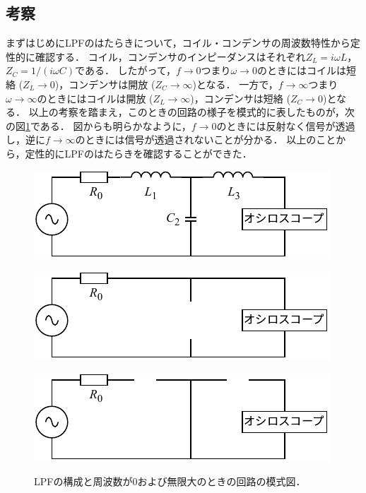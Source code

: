 \documentclass[uplatex,dvipdfmx,a4j,12pt]{jsarticle}
\begin{document}
\subsection{考察}
まずはじめにLPFのはたらきについて，コイル・コンデンサの周波数特性から定性的に確認する．
コイル，コンデンサのインピーダンスはそれぞれ$Z_L = i\omega L$，$Z_C = 1/(i\omega C)$である．
したがって，$f \to 0$つまり$\omega \to 0$のときにはコイルは短絡 ($Z_L \to 0$)，コンデンサは開放 ($Z_C \to \infty$)となる．
一方で，$f \to \infty$つまり$\omega \to \infty$のときにはコイルは開放 ($Z_L \to \infty$)，コンデンサは短絡 ($Z_C \to 0$)となる．
以上の考察を踏まえ，このときの回路の様子を模式的に表したものが，次の図\ref{fig:4-4}である．
図からも明らかなように，$f \to 0$のときには反射なく信号が透過し，逆に$f \to \infty$のときには信号が透過されないことが分かる．
以上のことから，定性的にLPFのはたらきを確認することができた．
\begin{figure}[H]
    \centering
    \begin{minipage}[b]{0.7\linewidth}
        \centering
        \includegraphics[width=\linewidth]{img/LPF.pdf}
        \label{fig:4-4-a}      
    \end{minipage}
    \begin{minipage}[b]{0.7\linewidth}
        \centering
        \includegraphics[width=\linewidth]{img/LPF_f_0.pdf}
        \label{fig:4-4-b}      
    \end{minipage}
    \begin{minipage}[b]{0.7\linewidth}
        \centering
        \includegraphics[width=\linewidth]{img/LPF_f_inf.pdf}
        \label{fig:4-4-c}      
    \end{minipage}
    \caption{LPFの構成と周波数が0および無限大のときの回路の模式図．}
    \label{fig:4-4}
\end{figure}
\end{document}
